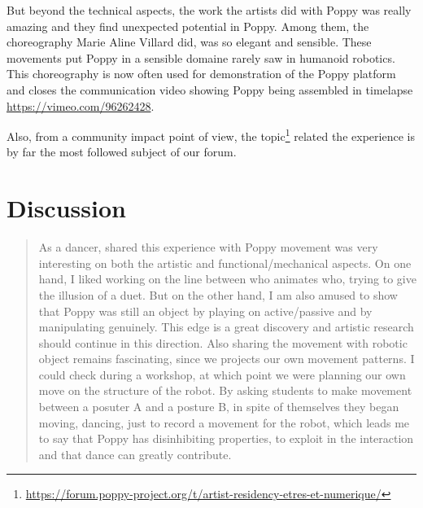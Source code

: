 But beyond the technical aspects, the work the artists did with Poppy was really amazing and they find unexpected potential in Poppy. Among them, the choreography Marie Aline Villard did, was so elegant and sensible. These movements put Poppy in a sensible domaine rarely saw in humanoid robotics. This choreography is now often used for demonstration of the Poppy platform and closes the communication video showing Poppy being assembled in timelapse \url{https://vimeo.com/96262428}.

Also, from a community impact point of view, the topic\footnote{\url{https://forum.poppy-project.org/t/artist-residency-etres-et-numerique/}} related the experience is by far the most followed subject of our forum.

\section{Discussion} %

\begin{quotation}
    As a dancer, shared this experience with Poppy movement was very interesting on both the artistic and functional/mechanical aspects. On one hand, I liked working on the line between who animates who, trying to give the illusion of a duet. But on the other hand, I am also amused to show that Poppy was still an object by playing on active/passive and by manipulating genuinely. This edge is a great discovery and artistic research should continue in this direction.
    Also sharing the movement with robotic object remains fascinating, since we projects our own movement patterns. I could check during a workshop, at which point we were planning our own move on the structure of the robot. By asking students to make movement between a posuter A and a posture B, in spite of themselves they began moving, dancing, just to record a movement for the robot, which leads me to say that Poppy has disinhibiting properties, to exploit in the interaction and that dance can greatly contribute.

\end{quotation}


